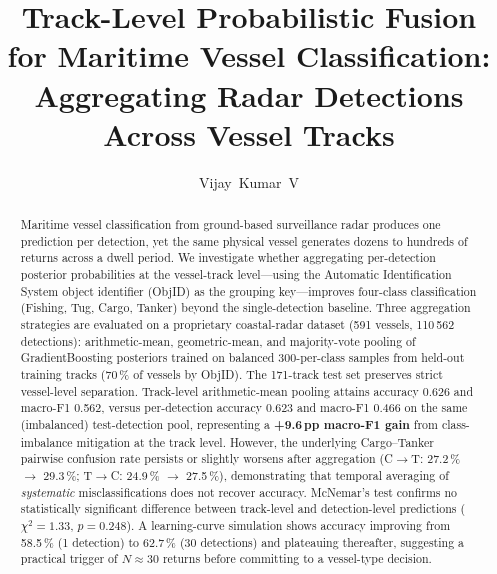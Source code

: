 \documentclass[10pt,journal,compsoc]{IEEEtran}
\begin{document}
\title{Track-Level Probabilistic Fusion for Maritime Vessel Classification:\\
Aggregating Radar Detections Across Vessel Tracks}

\author{Vijay~Kumar~V\\
}


\maketitle

\begin{abstract}
Maritime vessel classification from ground-based surveillance radar produces one
prediction per detection, yet the same physical vessel generates dozens to
hundreds of returns across a dwell period.  We investigate whether aggregating
per-detection posterior probabilities at the vessel-track level---using the
Automatic Identification System object identifier (ObjID) as the grouping
key---improves four-class classification (Fishing, Tug, Cargo, Tanker)
beyond the single-detection baseline.  Three aggregation strategies are
evaluated on a proprietary coastal-radar dataset (591 vessels, 110\,562
detections): arithmetic-mean, geometric-mean, and majority-vote pooling of
GradientBoosting posteriors trained on balanced 300-per-class samples from
held-out training tracks (70\,\% of vessels by ObjID).  The 171-track test set
preserves strict vessel-level separation.  Track-level arithmetic-mean pooling
attains accuracy 0.626 and macro-F1 0.562, versus per-detection accuracy
0.623 and macro-F1 0.466 on the same (imbalanced) test-detection pool,
representing a \textbf{+9.6\,pp macro-F1 gain} from class-imbalance
mitigation at the track level.  However, the underlying Cargo--Tanker
pairwise confusion rate persists or slightly worsens after aggregation
(C$\!\to\!$T: 27.2\,\% $\to$ 29.3\,\%; T$\!\to\!$C: 24.9\,\% $\to$ 27.5\,\%),
demonstrating that temporal averaging of \emph{systematic} misclassifications
does not recover accuracy.  McNemar's test confirms no statistically
significant difference between track-level and detection-level predictions
($\chi^2=1.33$, $p=0.248$).  A learning-curve simulation shows accuracy
improving from 58.5\,\% (1 detection) to 62.7\,\% (30 detections) and
plateauing thereafter, suggesting a practical trigger of $N\!\approx\!30$
returns before committing to a vessel-type decision.
\end{abstract}
\end{document}
